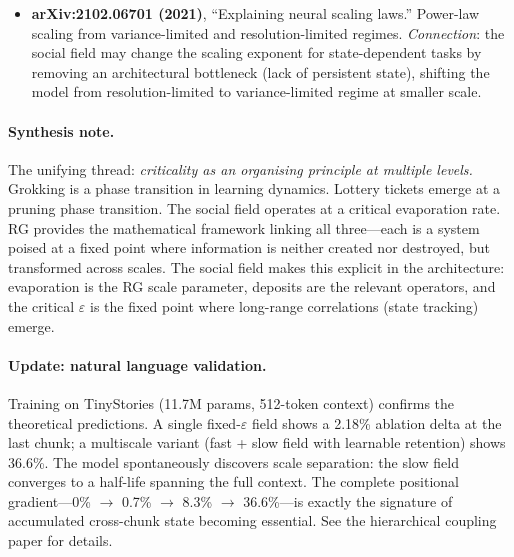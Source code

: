 \documentclass[11pt,a4paper]{article}
\begin{document}
\begin{itemize}
    \item \textbf{arXiv:2102.06701 (2021)}, ``Explaining neural scaling
          laws.''  Power-law scaling from variance-limited and
          resolution-limited regimes.  \emph{Connection}: the social
          field may change the scaling exponent for state-dependent tasks
          by removing an architectural bottleneck (lack of persistent
          state), shifting the model from resolution-limited to
          variance-limited regime at smaller scale.
\end{itemize}

\paragraph{Synthesis note.}
The unifying thread: \emph{criticality as an organising principle at
multiple levels.}  Grokking is a phase transition in learning dynamics.
Lottery tickets emerge at a pruning phase transition.  The social field
operates at a critical evaporation rate.  RG provides the mathematical
framework linking all three---each is a system poised at a fixed point
where information is neither created nor destroyed, but transformed
across scales.  The social field makes this explicit in the architecture:
evaporation is the RG scale parameter, deposits are the relevant
operators, and the critical $\varepsilon$ is the fixed point where
long-range correlations (state tracking) emerge.

\paragraph{Update: natural language validation.}
Training on TinyStories (11.7M params, 512-token context) confirms the
theoretical predictions.  A single fixed-$\varepsilon$ field shows a
2.18\% ablation delta at the last chunk; a multiscale variant (fast +
slow field with learnable retention) shows 36.6\%.  The model
spontaneously discovers scale separation: the slow field converges to a
half-life spanning the full context.  The complete positional
gradient---0\% $\to$ 0.7\% $\to$ 8.3\% $\to$ 36.6\%---is exactly the
signature of accumulated cross-chunk state becoming essential.  See the
hierarchical coupling paper for details.
\end{document}
